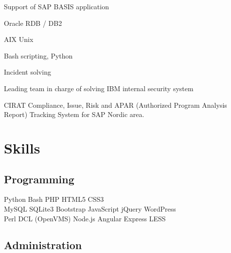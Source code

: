 \documentclass[letterpaper]{deedy-resume.en} %
\begin{document}
\begin{minipage}[t]{0.60\textwidth}


\begin{tightitemize}
\item Support of SAP BASIS application
\item Oracle RDB / DB2
\item AIX Unix
\item Bash scripting, Python
\item Incident solving
\item Leading team in charge of solving IBM internal security system
\item CIRAT Compliance, Issue, Risk and APAR (Authorized Program Analysis Report) Tracking System for SAP Nordic area.
\end{tightitemize}

\sectionspace %


\section{Skills}

\subsection{Programming}

Python \textbullet{} Bash \textbullet{} PHP \textbullet{} HTML5 \textbullet{} CSS3 \\
MySQL \textbullet{} SQLite3 \textbullet{} Bootstrap \textbullet{} JavaScript \textbullet{} jQuery \textbullet{} WordPress \\
Perl \textbullet{} DCL (OpenVMS) \textbullet{} Node.js \textbullet{} Angular \textbullet{} Express \textbullet{} LESS \\

\sectionspace %

\subsection{Administration}


\end{minipage}
\end{document}
